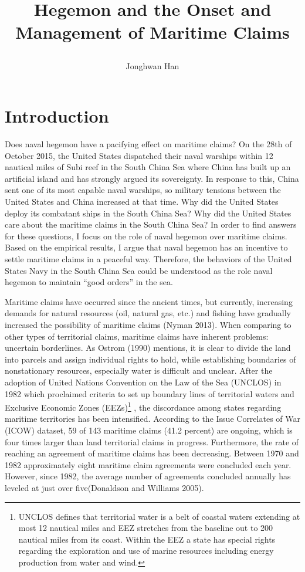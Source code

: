 \documentclass{article}
\begin{document}
\title{\begin{LARGE} Hegemon and the Onset and Management of Maritime Claims\end{LARGE}}
\author{Jonghwan Han}
\date{}
\maketitle
  
\section*{Introduction}
\hspace{0.5cm}Does naval hegemon have a pacifying effect on maritime claims? On the 28th of October 2015, the United States dispatched their naval warships within 12 nautical miles of Subi reef in the South China Sea where China has built up an artificial island and has strongly argued its sovereignty. In response to this, China sent one of its most capable naval warships, so military tensions between the United States and China increased at that time. Why did the United States deploy its combatant ships in the South China Sea? Why did the United States care about the maritime claims in the South China Sea? In order to find answers for these questions, I focus on the role of naval hegemon over maritime claims. Based on the empirical results, I argue that naval hegemon has an incentive to settle maritime claims in a peaceful way. Therefore, the behaviors of the United States Navy in the South China Sea could be understood as the role naval hegemon to maintain “good orders” in the sea. 

Maritime claims have occurred since the ancient times, but currently, increasing demands for natural resources (oil, natural gas, etc.) and fishing have gradually increased the possibility of maritime claims (Nyman 2013). When comparing to other types of territorial claims, maritime claims have inherent problems: uncertain borderlines. As Ostrom (1990) mentions, it is clear to divide the land into parcels and assign individual rights to hold, while establishing boundaries of nonstationary resources, especially water is difficult and unclear. After the adoption of United Nations Convention on the Law of the Sea (UNCLOS) in 1982 which proclaimed criteria to set up boundary lines of territorial waters and Exclusive Economic Zones (EEZs)\footnote{UNCLOS defines that territorial water is a belt of coastal waters extending at most 12 nautical miles and EEZ stretches from the baseline out to 200 nautical miles from its coast. Within the EEZ a state has special rights regarding the exploration and use of marine resources including energy production from water and wind.} , the discordance among states regarding maritime territories has been intensified. According to the Issue Correlates of War (ICOW) dataset, 59 of 143 maritime claims (41.2 percent) are ongoing, which is four times larger than land territorial claims in progress. Furthermore, the rate of reaching an agreement of maritime claims has been decreasing. Between 1970 and 1982 approximately eight maritime claim agreements were concluded each year. However, since 1982, the average number of agreements concluded annually has leveled at just over five(Donaldson and Williams 2005). 
\end{document}
